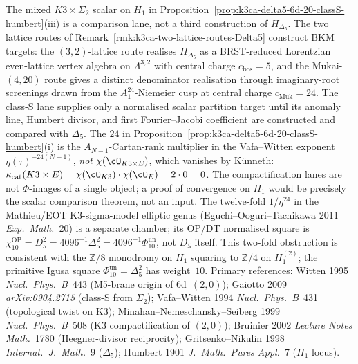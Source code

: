 \begin{remark}
\label{rmk:k3ca-classS-vs-lattice-delta5}
The mixed $K3\times\Sigma_2$ scalar on $H_1$ in Proposition~\ref{prop:k3ca-delta5-6d-20-classS-humbert}(iii) is a comparison lane, not a third construction of \(H_{\Delta_5}\). The two lattice routes of Remark~\ref{rmk:k3ca-two-lattice-routes-Delta5} construct BKM targets: the $(3,2)$-lattice route realises \(H_{\Delta_5}\) as a BRST-reduced Lorentzian even-lattice vertex algebra on \(\Lambda^{3,2}\) with central charge \(c_{\mathrm{bos}}=5\), and the Mukai-$(4,20)$ route gives a distinct denominator realisation through imaginary-root screenings drawn from the \(A_1^{24}\)-Niemeier cusp at central charge \(c_{\mathrm{Muk}}=24\). The class-S lane supplies only a normalised scalar partition target until its anomaly line, Humbert divisor, and first Fourier--Jacobi coefficient are constructed and compared with \(\Delta_5\). The \(24\) in Proposition~\ref{prop:k3ca-delta5-6d-20-classS-humbert}(i) is the \(A_{N-1}\)-Cartan-rank multiplier in the Vafa--Witten exponent \(\eta(\tau)^{-24(N-1)}\), \emph{not} \(\chi(\cO_{K3\times E})\), which vanishes by K\"unneth: \(\kappa_{\mathrm{cat}}(K3\times E)=\chi(\cO_{K3})\cdot\chi(\cO_E)=2\cdot 0=0\). The compactification lanes are not \(\Phi\)-images of a single object; a proof of convergence on \(H_1\) would be precisely the scalar comparison theorem, not an input. The twelve-fold \(1/\eta^{24}\) in the Mathieu/EOT K3-sigma-model elliptic genus (Eguchi--Ooguri--Tachikawa 2011 \emph{Exp.\ Math.}~20) is a separate chamber; its OP/DT normalised square is \(\chi_{10}^{\mathrm{OP}}=D_5^2=4096^{-1}\Delta_5^2=4096^{-1}\Phi_{10}^{\mathrm{un}}\), not \(D_5\) itself. This two-fold obstruction is consistent with the \(\mathbb Z/8\) monodromy on \(H_1\) squaring to \(\mathbb Z/4\) on \(H_1^{(2)}\); the primitive Igusa square \(\Phi_{10}^{\mathrm{un}}=\Delta_5^2\) has weight~\(10\). Primary references: Witten 1995 \emph{Nucl.\ Phys.\ B}~443 (M5-brane origin of 6d~$(2,0)$); Gaiotto 2009 \emph{arXiv:0904.2715} (class-S from \(\Sigma_2\)); Vafa--Witten 1994 \emph{Nucl.\ Phys.\ B}~431 (topological twist on K3); Minahan--Nemeschansky--Seiberg 1999 \emph{Nucl.\ Phys.\ B}~508 (K3 compactification of \((2,0)\)); Bruinier 2002 \emph{Lecture Notes Math.}~1780 (Heegner-divisor reciprocity); Gritsenko--Nikulin 1998 \emph{Internat.\ J.\ Math.}~9 (\(\Delta_5\)); Humbert 1901 \emph{J.\ Math.\ Pures Appl.}~7 (\(H_1\) locus).
\end{remark}

